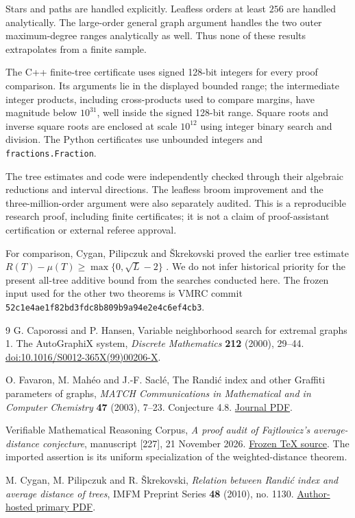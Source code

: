 \documentclass[11pt,a4paper]{article}
\theoremstyle{remark}
\numberwithin{equation}{section}
\begin{document}
Stars and paths are handled explicitly. Leafless orders at least $256$
are handled analytically. The large-order general graph argument handles
the two outer maximum-degree ranges analytically as well.
Thus none of these results extrapolates from a finite sample.

The C++ finite-tree certificate uses signed 128-bit integers for every
proof comparison. Its arguments lie in the displayed bounded range;
the intermediate integer products, including cross-products used to
compare margins, have magnitude below $10^{31}$, well inside the signed
128-bit range. Square roots and inverse square roots are enclosed at
scale $10^{12}$ using integer binary search and division. The Python
certificates use unbounded integers and \texttt{fractions.Fraction}.

The tree estimates and code were independently checked through their
algebraic reductions and interval directions. The leafless broom
improvement and the three-million-order argument were also separately
audited. This is a reproducible research proof, including finite
certificates; it is not a claim of proof-assistant certification or
external referee approval.

For comparison, Cygan, Pilipczuk and \v{S}krekovski proved the earlier
tree estimate $R(T)-\mu(T)\ge\max\{0,\sqrt L-2\}$ \cite{cps}.
We do not infer historical priority for the present all-tree additive
bound from the searches conducted here. The frozen input used for the
other two theorems is VMRC commit
\texttt{52c1e4ae1f82bd3fdc8b809b9a94e2e4c6ef4cb3}.

\clearpage
\begin{thebibliography}{9}
G. Caporossi and P. Hansen,
Variable neighborhood search for extremal graphs 1. The AutoGraphiX system,
\emph{Discrete Mathematics} \textbf{212} (2000), 29--44.
\href{https://doi.org/10.1016/S0012-365X(99)00206-X}
{doi:10.1016/S0012-365X(99)00206-X}.

O. Favaron, M. Mah\'eo and J.-F. Sacl\'e,
The Randi\'c index and other Graffiti parameters of graphs,
\emph{MATCH Communications in Mathematical and in Computer Chemistry}
\textbf{47} (2003), 7--23. Conjecture 4.8.
\href{https://match.pmf.kg.ac.rs/electronic_versions/Match47/match47_7-23.pdf}
{Journal PDF}.

Verifiable Mathematical Reasoning Corpus,
\emph{A proof audit of Fajtlowicz's average-distance conjecture},
manuscript [227], 21 November 2026.
\href{https://github.com/QEEDDD/Verifiable-Mathematical-Reasoning-Corpus/blob/52c1e4ae1f82bd3fdc8b809b9a94e2e4c6ef4cb3/\%5B227\%5D\%20Fajtlowicz_Proof_Audit.tex}
{Frozen TeX source}. The imported assertion is its uniform specialization
of the weighted-distance theorem.

M. Cygan, M. Pilipczuk and R. \v{S}krekovski,
\emph{Relation between Randi\'c index and average distance of trees},
IMFM Preprint Series \textbf{48} (2010), no. 1130.
\href{https://users.fmf.uni-lj.si/skreko/Old/MyPapers/01130.pdf}
{Author-hosted primary PDF}.
\end{thebibliography}
\end{document}
